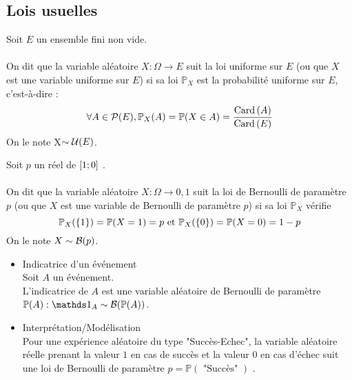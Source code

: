 \subsection{Lois usuelles}
\begin{defprop}
    Soit \(E\) un ensemble fini non vide.\\~\\
    On dit que la variable aléatoire \(X : \Omega \to E\) suit la loi uniforme sur \(E\) (ou que \(X\) est une variable uniforme sur \(E\)) si sa loi \(\mathbb{P}_{X}\) est la probabilité uniforme sur \(E\), c’est-à-dire :
    \[\forall A \in  \cal{P} (E) , \mathbb{P}_{X} (A) = \mathbb{P} (X \in  A) = \frac{\Card{A}}{\Card{E}}\]
    On le note X\( \sim \cal{U}(E)\).
\end{defprop}
\begin{defprop}
    Soit \(p\) un réel de \(\intervii{1}{0}\) .\\~\\
    On dit que la variable aléatoire \(X : \Omega \to {0, 1}\) suit la loi de Bernoulli de paramètre \(p\) (ou que \(X\) est une variable de Bernoulli de paramètre \(p\)) si sa loi \(\mathbb{P}_{X}\) vérifie
    \[\mathbb{P}_{X} (\accol{1}) = \mathbb{P} (X = 1) = p \text{ et }\mathbb{P}_{X} (\accol{0}) = \mathbb{P} (X = 0) = 1 - p\]
    On le note \(X \sim \cal{B}(p)\).
    \begin{itemize}
    \item Indicatrice d’un événement\\
    Soit \(A\) un événement.\\
    L’indicatrice de \(A\) est une variable aléatoire de Bernoulli de paramètre \(\mathbb{P}(A) : \ind{A} \sim \cal{B}(\mathbb{P}(A))\).
    \item Interprétation/Modélisation\\
    Pour une expérience aléatoire du type "Succès-Echec", la variable aléatoire réelle prenant la valeur \(1\) en cas de succès et la valeur \(0\) en cas d’échec suit une loi de Bernoulli de paramètre \(p = \mathbb{P} (\text{ "Succès" })\) .
    \end{itemize}
\end{defprop}

